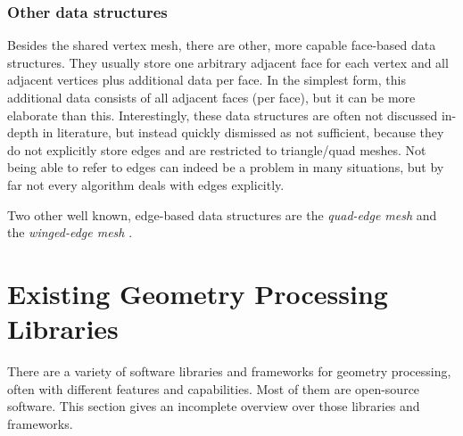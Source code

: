 \subsubsection*{Other data structures}

Besides the shared vertex mesh, there are other, more capable face-based data structures.
They usually store one arbitrary adjacent face for each vertex and all adjacent vertices plus additional data per face.
In the simplest form, this additional data consists of all adjacent faces (per face), but it can be more elaborate than this.
Interestingly, these data structures are often not discussed in-depth in literature, but instead quickly dismissed as not sufficient, because they do not explicitly store edges and are restricted to triangle/quad meshes.
Not being able to refer to edges can indeed be a problem in many situations, but by far not every algorithm deals with edges explicitly.

Two other well known, edge-based data structures are the \emph{quad-edge mesh} \cite{guibas1985primitives} and the \emph{winged-edge mesh} \cite{baumgart1972winged}.



\section{Existing Geometry Processing Libraries}

There are a variety of software libraries and frameworks for geometry processing, often with different features and capabilities.
Most of them are open-source software.
This section gives an incomplete overview over those libraries and frameworks.


